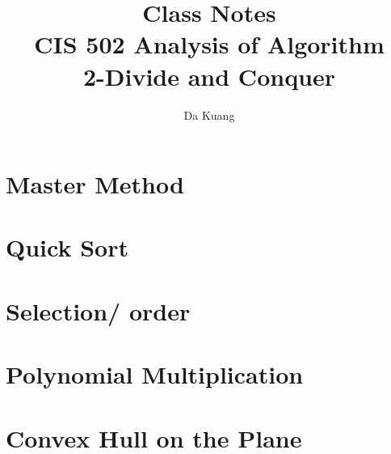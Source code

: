 \documentclass[en,hazy,blue,normal,12pt]{elegantnote}
\title{Class Notes\\CIS 502 Analysis of Algorithm\\2-Divide and Conquer}
\author{Da Kuang}
\institute{University of Pennsylvania}
\date{}
\begin{document}
\maketitle
\newpage
\tableofcontents
\newpage
\section{Master Method}

	
\section{Quick Sort}


\section{Selection/ order}


\section{Polynomial Multiplication}


\section{Convex Hull on the Plane}

\end{document}
